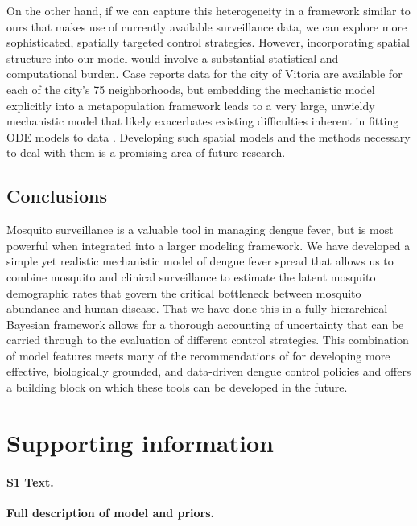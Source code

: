 \documentclass[10pt,letterpaper]{article}
\begin{document}
On the other hand, if we can capture this heterogeneity in a framework similar to ours that makes use of currently available surveillance data, we can explore more sophisticated, spatially targeted control strategies.
However, incorporating spatial structure into our model would involve a substantial statistical and computational burden.
Case reports data for the city of Vitoria are available for each of the city's 75 neighborhoods, but embedding the mechanistic model explicitly into a metapopulation framework leads to a very large, unwieldy mechanistic model that likely exacerbates existing difficulties inherent in fitting ODE models to data \cite{Girolami2008, Calderhead2011}.
Developing such spatial models and the methods necessary to deal with them is a promising area of future research.

\subsection*{Conclusions}

Mosquito surveillance is a valuable tool in managing dengue fever, but is most powerful when integrated into a larger modeling framework.
We have developed a simple yet realistic mechanistic model of dengue fever spread that allows us to combine mosquito and clinical surveillance to estimate the latent mosquito demographic rates that govern the critical bottleneck between mosquito abundance and human disease.
That we have done this in a fully hierarchical Bayesian framework allows for a thorough accounting of uncertainty that can be carried through to the evaluation of different control strategies.
This combination of model features meets many of the recommendations of \cite{Morrison2008, Achee2015} for developing more effective, biologically grounded, and data-driven dengue control policies and offers a building block on which these tools can be developed in the future.

\section*{Supporting information}

\paragraph*{S1 Text.}
\label{S1_Diag}
{\bf Full description of model and priors.}
\end{document}
